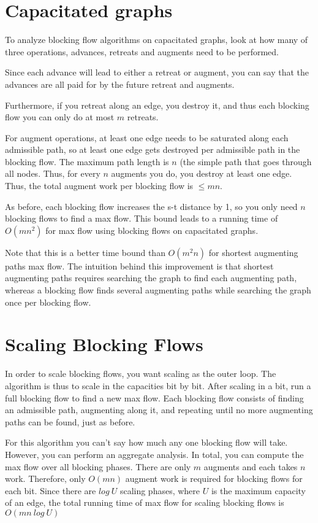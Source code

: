 \documentclass{article}
\begin{document}
\section{Capacitated graphs}

To analyze blocking flow algorithms on capacitated graphs, look at how many of three
operations, advances, retreats and augments need to be performed. 

Since each advance will lead to either a retreat or augment, you can say that the 
advances are all paid for by the future retreat and augments.  

Furthermore, if you retreat along an edge, you destroy it, and
thus each blocking flow you can only do at most $m$ retreats.  

For augment operations, at least
one edge needs to be saturated along each admissible path, so at least one edge gets destroyed
per admissible path in the blocking flow.  The maximum path length is $n$ (the simple path that goes 
through all nodes.  Thus, for every $n$ augments you do, you destroy at least one edge.  Thus, the total
augment work per blocking flow is $ \leq mn$.  

As before, each blocking flow increases the s-t distance by 1, so you only need $n$ blocking flows to find a max flow.  This bound leads to a running time of $O(m{n^2})$ for max flow using blocking flows on capacitated graphs. 

Note that this is a better time bound than $O(m^2n)$ for shortest augmenting paths max flow.  The intuition behind this improvement is that shortest augmenting paths requires searching the graph
to find each augmenting path, whereas a blocking flow finds several augmenting paths while searching the graph once per blocking flow.


\section{Scaling Blocking Flows}

In order to scale blocking flows, you want scaling as the outer loop.  The algorithm is thus to scale in the capacities bit by bit.  After scaling in a bit, run a full blocking flow to find a new max flow.  Each blocking flow consists of finding an admissible path, augmenting along it, and repeating until no more augmenting paths can be found, just as before.  

For this algorithm you can't say how much any one blocking flow will take.  However, you can perform an aggregate analysis.  In total, you can compute the max flow over all blocking phases.  There are only $m$ augments and each takes $n$ work.  Therefore, only $O(mn)$ augment work is required for blocking flows for each bit.  Since there are $log\ U$ scaling phases, where $U$ is the maximum capacity of an edge, the total running time of max flow for scaling blocking flows is $O(mn\ log\ U)$
\end{document}
